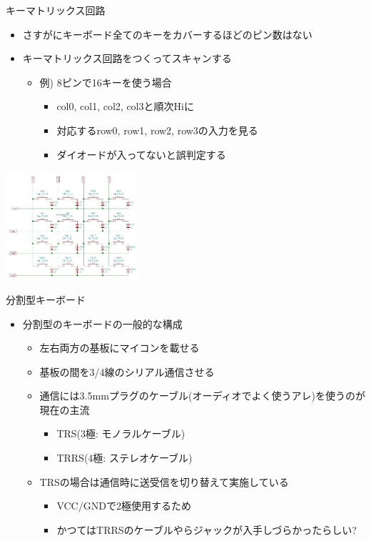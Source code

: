 \documentclass[cjk,dvipdfmx,10pt,compress,fragile%
hyperref={bookmarks=true,bookmarksnumbered=true,bookmarksopen=false,%
colorlinks=false,%
pdftitle={第 134 回 関西 Debian 勉強会},%
pdfauthor={小林},%
pdfsubject={資料},%
}]{beamer}
\begin{document}
\begin{frame}[fragile,t]{キーマトリックス回路}
 \begin{itemize}
  \item さすがにキーボード全てのキーをカバーするほどのピン数はない
  \item キーマトリックス回路をつくってスキャンする
	\begin{itemize}
	 \item 例) 8ピンで16キーを使う場合
	       \begin{itemize}
		\item col0, col1, col2, col3と順次Hiに
		\item 対応するrow0, row1, row2, row3の入力を見る
		\item ダイオードが入ってないと誤判定する
	       \end{itemize}
	\end{itemize}
 \end{itemize}
 \begin{center}
  \includegraphics[keepaspectratio,height=4cm]{./img/key-matrix.jpg}
 \end{center}
\end{frame}

\begin{frame}[fragile,t]{分割型キーボード}
 \begin{itemize}
  \item 分割型のキーボードの一般的な構成
	\begin{itemize}
	 \item 左右両方の基板にマイコンを載せる
	 \item 基板の間を3/4線のシリアル通信させる
	 \item 通信には3.5mmプラグのケーブル(オーディオでよく使うアレ)を使うのが現在の主流
	       \begin{itemize}
		\item TRS(3極: モノラルケーブル)
		\item TRRS(4極: ステレオケーブル)
	       \end{itemize}
	 \item TRSの場合は通信時に送受信を切り替えて実施している
	       \begin{itemize}
		\item VCC/GNDで2極使用するため
		\item かつてはTRRSのケーブルやらジャックが入手しづらかったらしい?
	       \end{itemize}
	\end{itemize}
 \end{itemize}
\end{frame}
\end{document}
